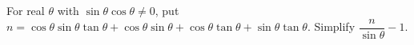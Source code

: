 For real $\theta$ with $\sin\theta\cos\theta\ne0$, put $n=\cos\theta\sin\theta\tan\theta+\cos\theta\sin\theta+\cos\theta\tan\theta+\sin\theta\tan\theta$. Simplify $\dfrac{n}{\sin\theta}-1$.
